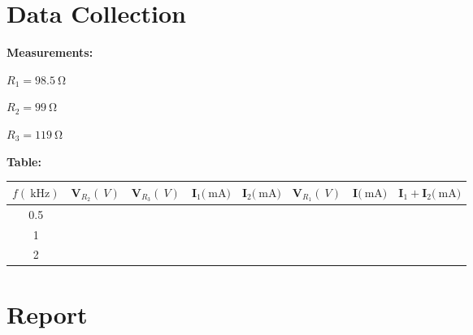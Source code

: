\documentclass[12pt]{article}
\begin{document}
\begin{large}
	\section{Data Collection}
	\textbf{Measurements:}\\
	\begin{minipage}{0.3\textwidth}
		$ R_1 = \SI{98.5}{\ohm} $
	\end{minipage}
	\hfill
	\begin{minipage}{0.3\textwidth}
		$ R_2 = \SI{99}{\ohm} $
	\end{minipage}
	\hfill
	\begin{minipage}{0.3\textwidth}
		$ R_3 = \SI{119}{\ohm} $
	\end{minipage}

	\vspace{20pt}
	\textbf{Table:}\\[8pt]
	\begin{tabular}{ |c|c|c|c|c|c|c|c| }
		\hline
		$f (\SI{}{\kilo\hertz}) $ & $ \mathbf{V}_{R_2} (\SI{}{V}) $ & $ \mathbf{V}_{R_3} (\SI{}{V}) $ & $ \mathbf{I}_1 (\SI{}{\milli\A)} $ & $ \mathbf{I}_2 (\SI{}{\milli\A)} $ & $ \mathbf{V}_{R_1} (\SI{}{V}) $ & $ \mathbf{I} (\SI{}{\milli\A)} $ & $ \mathbf{I}_1 + \mathbf{I}_2 (\SI{}{\milli\A)} $\\
        \hline
        0.5 &\\
        \hline
        1   &\\
        \hline
        2   &\\
        \hline
	\end{tabular}

    \section{Report}
\end{large}
\end{document}
